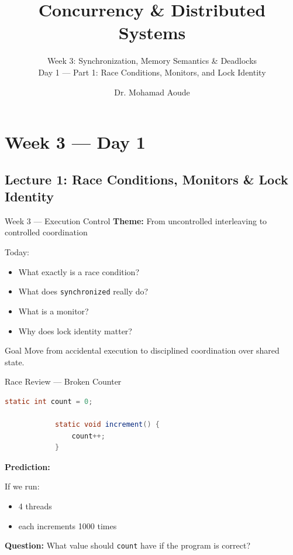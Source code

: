 \documentclass[aspectratio=169,11pt]{beamer}
\title{Concurrency \& Distributed Systems}
\subtitle{Week 3: Synchronization, Memory Semantics \& Deadlocks\\Day 1 --- Part 1: Race Conditions, Monitors, and Lock Identity}
\author{Dr. Mohamad Aoude}
\institute{Lebanese University \\ Faculty of Engineering}
\date{}
\begin{document}
	
	\begin{frame}
		\titlepage
	\end{frame}
	
	\section{Week 3 --- Day 1}
	\subsection{Lecture 1: Race Conditions, Monitors \& Lock Identity}
	
	\begin{frame}{Week 3 --- Execution Control}
		\textbf{Theme:} From uncontrolled interleaving to controlled coordination
		
		\bigskip
		
		Today:
		\begin{itemize}
			\item What exactly is a race condition?
			\item What does \texttt{synchronized} really do?
			\item What is a monitor?
			\item Why does lock identity matter?
		\end{itemize}
		
		\bigskip
		\begin{block}{Goal}
			Move from accidental execution to disciplined coordination over shared state.
		\end{block}
	\end{frame}
	
	\begin{frame}[fragile]{Race Review --- Broken Counter}
		\begin{lstlisting}[language=Java]
			static int count = 0;
			
			static void increment() {
				count++;
			}
		\end{lstlisting}
		
		\bigskip
		\textbf{Prediction:}
		
		If we run:
		\begin{itemize}
			\item 4 threads
			\item each increments 1000 times
		\end{itemize}
		
		\textbf{Question:} What value should \texttt{count} have if the program is correct?
	\end{frame}
	
\end{document}

